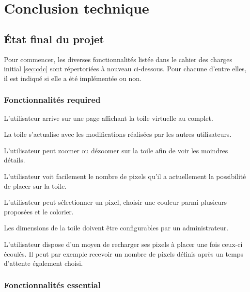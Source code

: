 \section{Conclusion technique}

\subsection{État final du projet}


Pour commencer, les diverses fonctionnalités listée dans le cahier des charges initial \ref{sec:cdc} sont répertoriées à nouveau ci-dessous. Pour chacune d'entre elles, il est indiqué si elle a été implémentée ou non.

\subsubsection{Fonctionnalités \guillemotleft required\guillemotright}

\begin{todolist}
  \item[\done] L'utilisateur arrive sur une page affichant la toile virtuelle au complet.
  \item[\done] La toile s'actualise avec les modifications réalisées par les autres utilisateurs.
  \item[\done] L'utilisateur peut zoomer ou dézoomer sur la toile afin de voir les moindres détails.
  \item[\done] L'utilisateur voit facilement le nombre de pixels qu'il a actuellement la possibilité de placer sur la toile.
  \item[\done] L'utilisateur peut sélectionner un pixel, choisir une couleur parmi plusieurs proposées et le colorier.
  \item[\done] Les dimensions de la toile doivent être configurables par un administrateur.
  \item[\done] L'utilisateur dispose d'un moyen de recharger ses pixels à placer une fois ceux-ci écoulés. Il peut par exemple recevoir un nombre de pixels définis après un temps d'attente également choisi.
\end{todolist}

\subsubsection{Fonctionnalités \guillemotleft essential\guillemotright}

